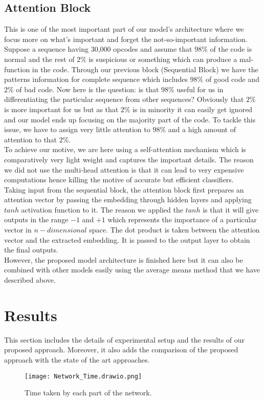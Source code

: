 \documentclass[conference]{IEEEtran}
\begin{document}
\subsection{Attention Block}
This is one of the most important part of our model’s architecture where we focus more on what’s important and forget the not-so-important information.\\
Suppose a sequence having 30,000 opcodes and assume that \(98\%\) of the code is normal and the rest of \(2\%\) is suspicious or something which can produce a mal-function in the code. Through our previous block (Sequential Block) we have the patterns information for complete sequence which includes \(98\%\) of good code and \(2\%\) of bad code. Now here is the question: is that \(98\%\) useful for us in differentiating the particular sequence from other
sequences? Obviously that \(2\%\) is more important for us but as that \(2\%\) is in minority it can easily get ignored and our model ends up focusing on the majority part of the code. To tackle this
issue, we have to assign very little attention to \(98\%\) and a high amount of attention to that \(2\%\).\\
To achieve our motive, we are here using a self-attention mechanism which is comparatively very light weight and captures the important details. The reason we did not use the multi-head attention is that it can lead to very expensive computations hence killing the motive
of accurate but efficient classifiers.\\
Taking input from the sequential block, the attention block first prepares an attention vector by passing the embedding through hidden layers and applying \(tanh\) activation function
to it. The reason we applied the \(tanh\) is that it will give outputs in the range \(-1\) and \(+1\) which represents the importance of a particular vector in \(n-dimensional\) space. The dot product is taken between the attention vector and the extracted embedding. It is passed to the output layer to obtain the final outputs.\\
However, the proposed model architecture is finished here but it can also be combined with other models easily using the average means method that we have described above.

\section{Results}
This section includes the details of experimental setup and the results of our proposed approach. Moreover, it also adds the comparison of the proposed approach with the state of the art approaches.
\begin{figure*}
    \centering
    \texttt{[image: Network\_Time.drawio.png]}
    \caption{Time taken by each part of the network.}
    \label{fig:time}
\end{figure*}
\end{document}
